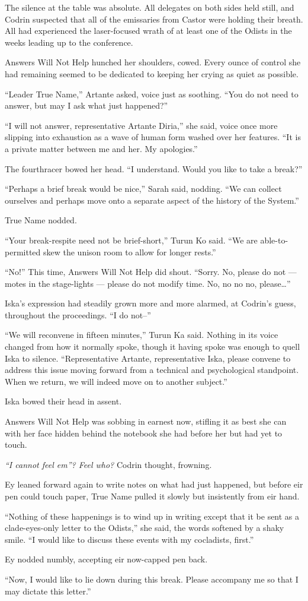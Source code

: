 The silence at the table was absolute. All delegates on both sides held still, and Codrin suspected that all of the emissaries from Castor were holding their breath. All had experienced the laser-focused wrath of at least one of the Odists in the weeks leading up to the conference.

Answers Will Not Help hunched her shoulders, cowed. Every ounce of control she had remaining seemed to be dedicated to keeping her crying as quiet as possible.

``Leader True Name,'' Artante asked, voice just as soothing. ``You do not need to answer, but may I ask what just happened?''

``I will not answer, representative Artante Diria,'' she said, voice once more slipping into exhaustion as a wave of human form washed over her features. ``It is a private matter between me and her. My apologies.''

The fourthracer bowed her head. ``I understand. Would you like to take a break?''

``Perhaps a brief break would be nice,'' Sarah said, nodding. ``We can collect ourselves and perhaps move onto a separate aspect of the history of the System.''

True Name nodded.

``Your break-respite need not be brief-short,'' Turun Ko said. ``We are able-to-permitted skew the unison room to allow for longer rests.''

``No!'' This time, Answers Will Not Help did shout. ``Sorry. No, please do not — motes in the stage-lights — please do not modify time. No, no no no, please\ldots{}''

Iska's expression had steadily grown more and more alarmed, at Codrin's guess, throughout the proceedings. ``I do not--''

``We will reconvene in fifteen minutes,'' Turun Ka said. Nothing in its voice changed from how it normally spoke, though it having spoke was enough to quell Iska to silence. ``Representative Artante, representative Iska, please convene to address this issue moving forward from a technical and psychological standpoint. When we return, we will indeed move on to another subject.''

Iska bowed their head in assent.

Answers Will Not Help was sobbing in earnest now, stifling it as best she can with her face hidden behind the notebook she had before her but had yet to touch.

\emph{``I cannot feel em''? Feel who?} Codrin thought, frowning.

Ey leaned forward again to write notes on what had just happened, but before eir pen could touch paper, True Name pulled it slowly but insistently from eir hand.

``Nothing of these happenings is to wind up in writing except that it be sent as a clade-eyes-only letter to the Odists,'' she said, the words softened by a shaky smile. ``I would like to discuss these events with my cocladists, first.''

Ey nodded numbly, accepting eir now-capped pen back.

``Now, I would like to lie down during this break. Please accompany me so that I may dictate this letter.''

